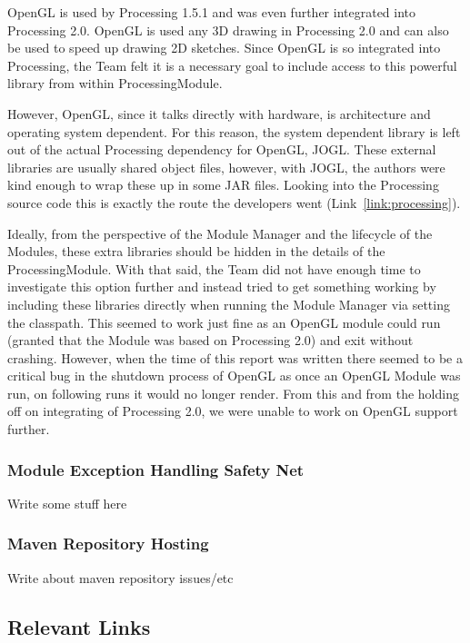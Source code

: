 \documentclass[11pt,letterpaper]{article}
\begin{document}
	OpenGL is used by Processing 1.5.1 and was even further integrated into
	Processing 2.0.  OpenGL is used any 3D drawing in Processing 2.0 and can also
	be used to speed up drawing 2D sketches.  Since OpenGL is so integrated into
	Processing, the Team felt it is a necessary goal to include access to this
	powerful library from within ProcessingModule.

	However, OpenGL, since it talks directly with hardware, is architecture and
	operating system dependent. For this reason, the system dependent library is
	left out of the actual Processing dependency for OpenGL, JOGL.  These external
	libraries are usually shared object files, however, with JOGL, the authors
	were kind enough to wrap these up in some JAR files.  Looking into the
	Processing source code this is exactly the route the developers went
	(Link~\ref{link:processing}). 

	Ideally, from the perspective of the Module Manager and the lifecycle of the
	Modules, these extra libraries should be hidden in the details of the
	ProcessingModule. With that said, the Team did not have enough time to
	investigate this option further and instead tried to get something working by
	including these libraries directly when running the Module Manager via setting
	the classpath. This seemed to work just fine as an OpenGL module could run
	(granted that the Module was based on Processing 2.0) and exit without
	crashing.  However, when the time of this report was written there seemed to
	be a critical bug in the shutdown process of OpenGL as once an OpenGL Module
	was run, on following runs it would no longer render. From this and from the
	holding off on integrating of Processing 2.0, we were unable to work on OpenGL
	support further. 

	\subsubsection{Module Exception Handling Safety Net}
	\label{sec:cont_dev_module_exception}
	Write some stuff here

	\subsubsection{Maven Repository Hosting}
	\label{sec:cont_dev_maven_repo}
	Write about maven repository issues/etc

	\pagebreak

	\subsection{Relevant Links}
	\label{sec:relevant_links}
\end{document}
